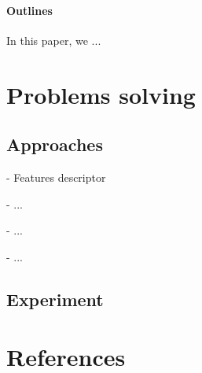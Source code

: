 \documentclass[review]{elsarticle}
\begin{document}
\paragraph{Outlines} 
In this paper, we ...

\section{Problems solving}

\subsection{Approaches}
- Features descriptor

- ...

- ...

- ...

\subsection{Experiment}



\section*{References}

% 
\end{document}

